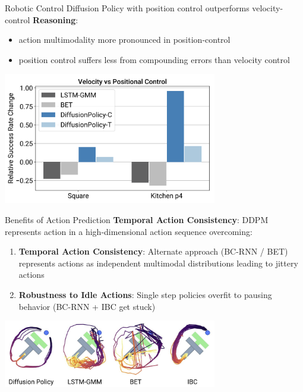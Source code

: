 \documentclass{beamer}
\begin{document}
\begin{frame}[t]{Robotic Control}
    Diffusion Policy with position control outperforms velocity-control
    \textbf{Reasoning}:
    \begin{itemize}[label=-]
        \item action multimodality more pronounced in position-control
        \item position control suffers less from compounding errors than velocity control
    \end{itemize}
    \begin{center}
        \includegraphics[width=0.7\textwidth]{./img/control_cmp.png}
    \end{center}
\end{frame}

\begin{frame}[t]{Benefits of Action Prediction}
    \textbf{Temporal Action Consistency}: DDPM represents action in a high-dimensional action sequence overcoming:
    \begin{enumerate}[label=\arabic*.]
        \item \textbf{Temporal Action Consistency}: Alternate approach (BC-RNN / BET) represents actions as independent multimodal distributions leading to jittery actions
        \item \textbf{Robustness to Idle Actions}: Single step policies overfit to pausing behavior (BC-RNN + IBC get stuck) %
    \end{enumerate}
    \begin{center}
        \includegraphics[width=0.7\textwidth]{./img/multimodal_beh.png}
    \end{center}
\end{frame}
\end{document}
